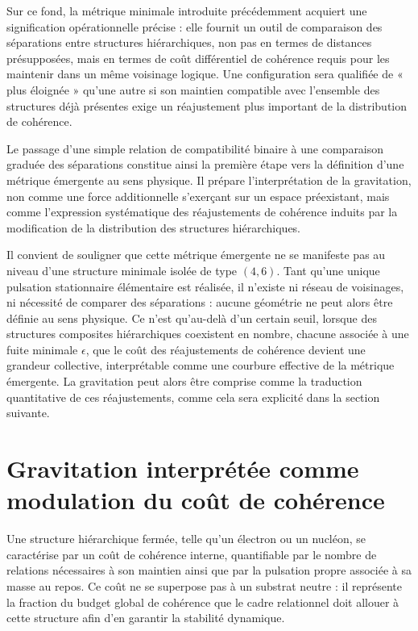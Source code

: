 \documentclass[11pt,a4paper]{article}
\begin{document}
Sur ce fond, la métrique minimale introduite précédemment acquiert une signification opérationnelle précise : elle fournit un outil de comparaison des séparations entre structures hiérarchiques, non pas en termes de distances présupposées, mais en termes de coût différentiel de cohérence requis pour les maintenir dans un même voisinage logique. Une configuration sera qualifiée de « plus éloignée » qu’une autre si son maintien compatible avec l’ensemble des structures déjà présentes exige un réajustement plus important de la distribution de cohérence.

Le passage d’une simple relation de compatibilité binaire à une comparaison graduée des séparations constitue ainsi la première étape vers la définition d’une métrique émergente au sens physique. Il prépare l’interprétation de la gravitation, non comme une force additionnelle s’exerçant sur un espace préexistant, mais comme l’expression systématique des réajustements de cohérence induits par la modification de la distribution des structures hiérarchiques.

Il convient de souligner que cette métrique émergente ne se manifeste pas au niveau d’une structure minimale isolée de type \((4,6)\). Tant qu’une unique pulsation stationnaire élémentaire est réalisée, il n’existe ni réseau de voisinages, ni nécessité de comparer des séparations : aucune géométrie ne peut alors être définie au sens physique. Ce n’est qu’au-delà d’un certain seuil, lorsque des structures composites hiérarchiques coexistent en nombre, chacune associée à une fuite minimale \(\epsilon\), que le coût des réajustements de cohérence devient une grandeur collective, interprétable comme une courbure effective de la métrique émergente. La gravitation peut alors être comprise comme la traduction quantitative de ces réajustements, comme cela sera explicité dans la section suivante.

\section{Gravitation interprétée comme modulation du coût de cohérence}

Une structure hiérarchique fermée, telle qu’un électron ou un nucléon, se caractérise par un coût de cohérence interne, quantifiable par le nombre de relations nécessaires à son maintien ainsi que par la pulsation propre associée à sa masse au repos. Ce coût ne se superpose pas à un substrat neutre : il représente la fraction du budget global de cohérence que le cadre relationnel doit allouer à cette structure afin d’en garantir la stabilité dynamique.
\end{document}
